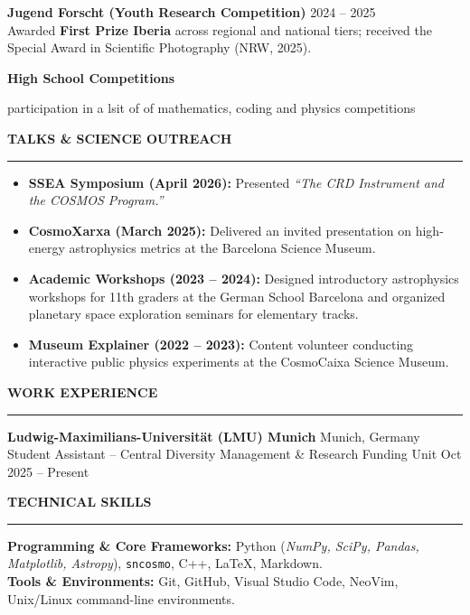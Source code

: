 \documentclass[10pt,a4paper]{article}
\newcommand{\cvsection}[1]{%
    \vspace{14pt}
    {\large\bfseries\MakeUppercase{#1}}
    \vspace{2pt}\hrule\vspace{6pt}
}
\begin{document}
\vspace{4pt}

\textbf{Jugend Forscht (Youth Research Competition)} \hfill 2024 -- 2025 \\
Awarded \textbf{First Prize Iberia} across regional and national tiers; received the Special Award in Scientific Photography (NRW, 2025).

\textbf{High School Competitions} \hfill

participation in a lsit of of mathematics, coding and physics competitions

\cvsection{Talks \& Science Outreach}

\begin{itemize}
    \itemsep0em 
    \item \textbf{SSEA Symposium (April 2026):} Presented \textit{``The CRD Instrument and the COSMOS Program.''}
    \item \textbf{CosmoXarxa (March 2025):} Delivered an invited presentation on high-energy astrophysics metrics at the Barcelona Science Museum.
    \item \textbf{Academic Workshops (2023 -- 2024):} Designed introductory astrophysics workshops for 11th graders at the German School Barcelona and organized planetary space exploration seminars for elementary tracks.
    \item \textbf{Museum Explainer (2022 -- 2023):} Content volunteer conducting interactive public physics experiments at the CosmoCaixa Science Museum.
\end{itemize}

\cvsection{Work Experience}

\textbf{Ludwig-Maximilians-Universität (LMU) Munich} \hfill Munich, Germany \\
Student Assistant -- Central Diversity Management \& Research Funding Unit \hfill Oct 2025 -- Present

\cvsection{Technical Skills}

\textbf{Programming \& Core Frameworks:} Python (\textit{NumPy, SciPy, Pandas, Matplotlib, Astropy}), \texttt{sncosmo}, C++, \LaTeX, Markdown. \\
\textbf{Tools \& Environments:} Git, GitHub, Visual Studio Code, NeoVim, Unix/Linux command-line environments.
\end{document}
